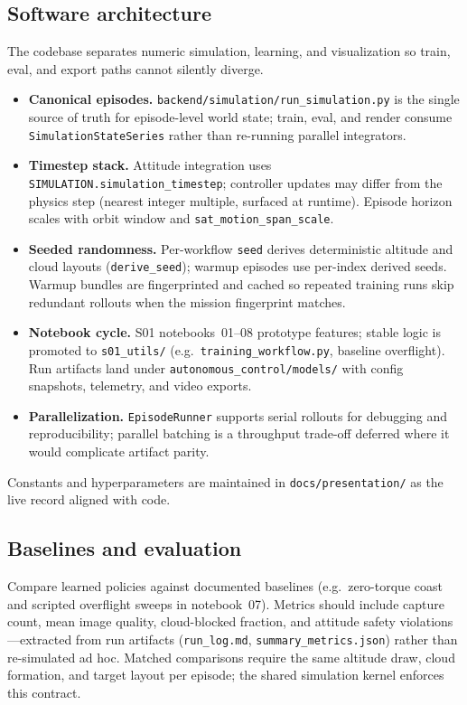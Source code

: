 \subsection{Software architecture}
The codebase separates numeric simulation, learning, and visualization so train, eval, and export paths cannot silently diverge.
\begin{itemize}
  \item \textbf{Canonical episodes.} \texttt{backend/simulation/run\_simulation.py} is the single source of truth for episode-level world state; train, eval, and render consume \texttt{SimulationStateSeries} rather than re-running parallel integrators.
  \item \textbf{Timestep stack.} Attitude integration uses \texttt{SIMULATION.simulation\_timestep}; controller updates may differ from the physics step (nearest integer multiple, surfaced at runtime). Episode horizon scales with orbit window and \texttt{sat\_motion\_span\_scale}.
  \item \textbf{Seeded randomness.} Per-workflow \texttt{seed} derives deterministic altitude and cloud layouts (\texttt{derive\_seed}); warmup episodes use per-index derived seeds. Warmup bundles are fingerprinted and cached so repeated training runs skip redundant rollouts when the mission fingerprint matches.
  \item \textbf{Notebook cycle.} S01 notebooks~01--08 prototype features; stable logic is promoted to \texttt{s01\_utils/} (e.g.\ \texttt{training\_workflow.py}, baseline overflight). Run artifacts land under \texttt{autonomous\_control/models/} with config snapshots, telemetry, and video exports.
  \item \textbf{Parallelization.} \texttt{EpisodeRunner} supports serial rollouts for debugging and reproducibility; parallel batching is a throughput trade-off deferred where it would complicate artifact parity.
\end{itemize}
Constants and hyperparameters are maintained in \texttt{docs/presentation/} as the live record aligned with code.

\subsection{Baselines and evaluation}
Compare learned policies against documented baselines (e.g.\ zero-torque coast and scripted overflight sweeps in notebook~07).
Metrics should include capture count, mean image quality, cloud-blocked fraction, and attitude safety violations---extracted from run artifacts (\texttt{run\_log.md}, \texttt{summary\_metrics.json}) rather than re-simulated ad hoc.
Matched comparisons require the same altitude draw, cloud formation, and target layout per episode; the shared simulation kernel enforces this contract.

